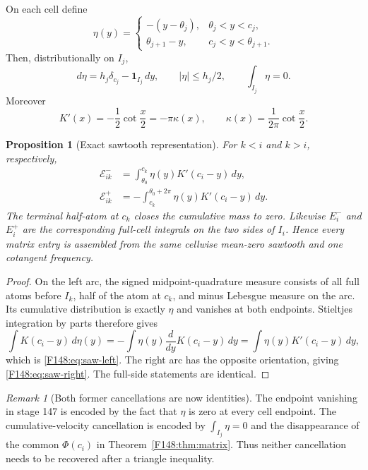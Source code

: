 \documentclass[11pt]{amsart}
\providecommand{\mathscr}{\mathcal}
\numberwithin{equation}{section}
\newtheorem{proposition}[theorem]{Proposition}
\theoremstyle{definition}
\theoremstyle{remark}
\newtheorem{remark}[theorem]{Remark}
\providecommand{\mathscr}[1]{\mathcal{#1}}
\begin{document}
On each cell define
\begin{equation}\label{F148:eq:eta}
 \eta(y)=\begin{cases}
 -(y-\theta_j),&\theta_j<y<c_j,\\
 \theta_{j+1}-y,&c_j<y<\theta_{j+1}.
 \end{cases}
\end{equation}
Then, distributionally on $I_j$,
\begin{equation}\label{F148:eq:eta-properties}
 d\eta=h_j\delta_{c_j}-\mathbf1_{I_j}\,dy,\qquad
 |\eta|\le h_j/2,\qquad
 \int_{I_j}\eta=0.
\end{equation}
Moreover
\begin{equation}\label{F148:eq:Kprime}
 K'(x)=-\frac12\cot\frac x2=-\pi\kappa(x),
 \qquad \kappa(x)=\frac1{2\pi}\cot\frac x2.
\end{equation}

\begin{proposition}[Exact sawtooth representation]
\label{F148:prop:sawtooth}
For $k<i$ and $k>i$, respectively,
\begin{align}
 \mathscr E_{ik}^-&=
 \int_{\theta_0}^{c_k}\eta(y)K'(c_i-y)\,dy,
 \label{F148:eq:saw-left}\\
 \mathscr E_{ik}^+&=-
 \int_{c_k}^{\theta_0+2\pi}\eta(y)K'(c_i-y)\,dy.
 \label{F148:eq:saw-right}
\end{align}
The terminal half-atom at $c_k$ closes the cumulative mass to zero.
Likewise $E_i^-$ and $E_i^+$ are the corresponding full-cell integrals
on the two sides of $I_i$.  Hence every matrix entry is assembled from
the same cellwise mean-zero sawtooth and one cotangent frequency.
\end{proposition}

\begin{proof}
On the left arc, the signed midpoint-quadrature measure consists of all
full atoms before $I_k$, half of the atom at $c_k$, and minus Lebesgue
measure on the arc.  Its cumulative distribution is exactly $\eta$ and
vanishes at both endpoints.  Stieltjes integration by parts therefore
gives
\begin{equation*}
 \int K(c_i-y)\,d\eta(y)
 =-\int\eta(y)\frac d{dy}K(c_i-y)\,dy
 =\int\eta(y)K'(c_i-y)\,dy,
\end{equation*}
which is \eqref{F148:eq:saw-left}.  The right arc has the opposite orientation,
giving \eqref{F148:eq:saw-right}.  The full-side statements are identical.
\end{proof}

\begin{remark}[Both former cancellations are now identities]
The endpoint vanishing in stage 147 is encoded by the fact that $\eta$
is zero at every cell endpoint.  The cumulative-velocity cancellation is
encoded by $\int_{I_j}\eta=0$ and the disappearance of the common
$\Phi(c_i)$ in Theorem~\ref{F148:thm:matrix}.  Thus neither cancellation needs
to be recovered after a triangle inequality.
\end{remark}
\endgroup
\end{document}
